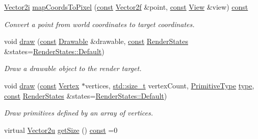 \begin{DoxyCompactItemize}
\hyperlink{namespacesf_a0eed58bf66694ebbc55f72ca7de840d9}{Vector2i} \hyperlink{classsf_1_1_render_target_a7a2d427bdb9bd8f9f456fcf82813aa60}{map\-Coords\-To\-Pixel} (\hyperlink{term__entry_8h_a57bd63ce7f9a353488880e3de6692d5a}{const} \hyperlink{namespacesf_a80cea3c46537294fd1d8d428566ad8b2}{Vector2f} \&point, \hyperlink{term__entry_8h_a57bd63ce7f9a353488880e3de6692d5a}{const} \hyperlink{classsf_1_1_view}{View} \&view) \hyperlink{term__entry_8h_a57bd63ce7f9a353488880e3de6692d5a}{const} 
\begin{DoxyCompactList}\small\item\em Convert a point from world coordinates to target coordinates. \end{DoxyCompactList}\item 
void \hyperlink{classsf_1_1_render_target_a12417a3bcc245c41d957b29583556f39}{draw} (\hyperlink{term__entry_8h_a57bd63ce7f9a353488880e3de6692d5a}{const} \hyperlink{classsf_1_1_drawable}{Drawable} \&drawable, \hyperlink{term__entry_8h_a57bd63ce7f9a353488880e3de6692d5a}{const} \hyperlink{classsf_1_1_render_states}{Render\-States} \&states=\hyperlink{classsf_1_1_render_states_afa30e6d780c05c2a20587ddb01b5fa5c}{Render\-States\-::\-Default})
\begin{DoxyCompactList}\small\item\em Draw a drawable object to the render target. \end{DoxyCompactList}\item 
void \hyperlink{classsf_1_1_render_target_a976bc94057799eb9f8a18ac5fdfd9b73}{draw} (\hyperlink{term__entry_8h_a57bd63ce7f9a353488880e3de6692d5a}{const} \hyperlink{classsf_1_1_vertex}{Vertex} $\ast$vertices, \hyperlink{nc__alloc_8h_a7b60c5629e55e8ec87a4547dd4abced4}{std\-::size\-\_\-t} vertex\-Count, \hyperlink{group__graphics_ga5ee56ac1339984909610713096283b1b}{Primitive\-Type} \hyperlink{_entity_8cpp_aa209819775142a76b8e49319d79ecab2}{type}, \hyperlink{term__entry_8h_a57bd63ce7f9a353488880e3de6692d5a}{const} \hyperlink{classsf_1_1_render_states}{Render\-States} \&states=\hyperlink{classsf_1_1_render_states_afa30e6d780c05c2a20587ddb01b5fa5c}{Render\-States\-::\-Default})
\begin{DoxyCompactList}\small\item\em Draw primitives defined by an array of vertices. \end{DoxyCompactList}\item 
virtual \hyperlink{namespacesf_a41039649eb65ea7646e2b97cfe124b4f}{Vector2u} \hyperlink{classsf_1_1_render_target_a2e5ade2457d9fb4c4907ae5b3d9e94a5}{get\-Size} () \hyperlink{term__entry_8h_a57bd63ce7f9a353488880e3de6692d5a}{const} =0

\end{DoxyCompactItemize}
